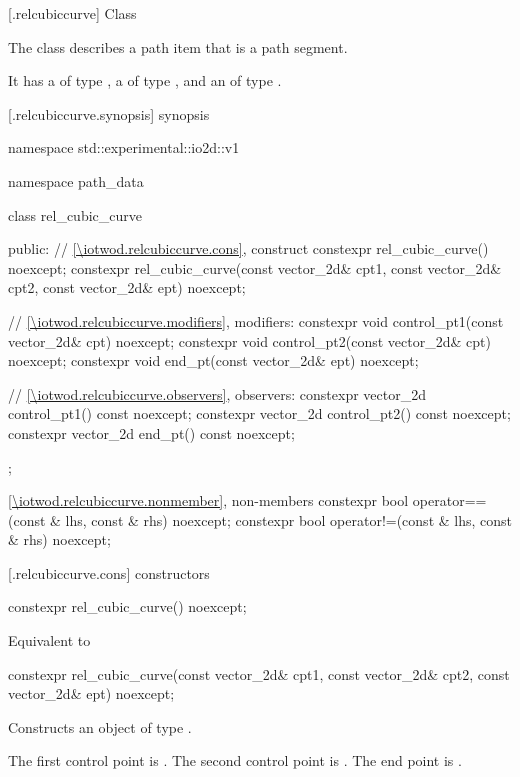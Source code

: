  [\iotwod.relcubiccurve] {Class }

\pnum
{}%
The class  describes a path item that is a path segment.

\pnum
It has a  of type , a  of type , and an  of type .

 [\iotwod.relcubiccurve.synopsis] { synopsis}

\begin{codeblock}
namespace std::experimental::io2d::v1 {
  namespace path_data {
    class rel_cubic_curve {
    public:
      // \ref{\iotwod.relcubiccurve.cons}, construct
      constexpr rel_cubic_curve() noexcept;
      constexpr rel_cubic_curve(const vector_2d& cpt1, const vector_2d& cpt2,
        const vector_2d& ept) noexcept;

      // \ref{\iotwod.relcubiccurve.modifiers}, modifiers:
      constexpr void control_pt1(const vector_2d& cpt) noexcept;
      constexpr void control_pt2(const vector_2d& cpt) noexcept;
      constexpr void end_pt(const vector_2d& ept) noexcept;

      // \ref{\iotwod.relcubiccurve.observers}, observers:
      constexpr vector_2d control_pt1() const noexcept;
      constexpr vector_2d control_pt2() const noexcept;
      constexpr vector_2d end_pt() const noexcept;
    };
    
    \ref{\iotwod.relcubiccurve.nonmember}, non-members
    constexpr bool operator==(const & lhs, const & rhs) noexcept;
    constexpr bool operator!=(const & lhs, const & rhs) noexcept;
  }
}
\end{codeblock}

 [\iotwod.relcubiccurve.cons] { constructors}

%
\begin{itemdecl}
constexpr rel_cubic_curve() noexcept;
\end{itemdecl}
\begin{itemdescr}
\pnum
\effects
Equivalent to 
\end{itemdescr}

%
\begin{itemdecl}
constexpr rel_cubic_curve(const vector_2d& cpt1, const vector_2d& cpt2,
  const vector_2d& ept) noexcept;
\end{itemdecl}
\begin{itemdescr}
\pnum
\effects
Constructs an object of type .

\pnum
The first control point is . The second control point is . The end point is .
\end{itemdescr}

